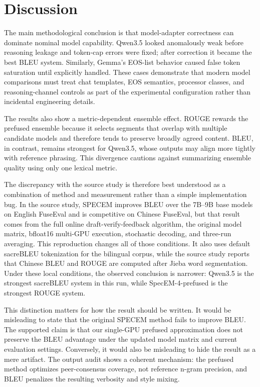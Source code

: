\documentclass[11pt]{article}
\begin{document}
\section{Discussion}
The main methodological conclusion is that model-adapter correctness can dominate nominal model capability. Qwen3.5 looked anomalously weak before reasoning leakage and token-cap errors were fixed; after correction it became the best BLEU system. Similarly, Gemma's EOS-list behavior caused false token saturation until explicitly handled. These cases demonstrate that modern model comparisons must treat chat templates, EOS semantics, processor classes, and reasoning-channel controls as part of the experimental configuration rather than incidental engineering details.

The results also show a metric-dependent ensemble effect. ROUGE rewards the prefused ensemble because it selects segments that overlap with multiple candidate models and therefore tends to preserve broadly agreed content. BLEU, in contrast, remains strongest for Qwen3.5, whose outputs may align more tightly with reference phrasing. This divergence cautions against summarizing ensemble quality using only one lexical metric.

The discrepancy with the source study is therefore best understood as a combination of method and measurement rather than a simple implementation bug. In the source study, SPECEM improves BLEU over the 7B--9B base models on English FuseEval and is competitive on Chinese FuseEval, but that result comes from the full online draft-verify-feedback algorithm, the original model matrix, bfloat16 multi-GPU execution, stochastic decoding, and three-run averaging. This reproduction changes all of those conditions. It also uses default sacreBLEU tokenization for the bilingual corpus, while the source study reports that Chinese BLEU and ROUGE are computed after Jieba word segmentation. Under these local conditions, the observed conclusion is narrower: Qwen3.5 is the strongest sacreBLEU system in this run, while SpecEM-4-prefused is the strongest ROUGE system.

This distinction matters for how the result should be written. It would be misleading to state that the original SPECEM method fails to improve BLEU. The supported claim is that our single-GPU prefused approximation does not preserve the BLEU advantage under the updated model matrix and current evaluation settings. Conversely, it would also be misleading to hide the result as a mere artifact. The output audit shows a coherent mechanism: the prefused method optimizes peer-consensus coverage, not reference n-gram precision, and BLEU penalizes the resulting verbosity and style mixing.
\end{document}
